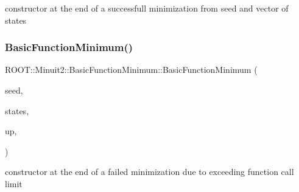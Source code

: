 constructor at the end of a successfull minimization from seed and vector of states 

\mbox{\label{classROOT_1_1Minuit2_1_1BasicFunctionMinimum_a2a15d2336acfb9f3be41de8e477c191a}} 
\subsubsection{\texorpdfstring{BasicFunctionMinimum()}{BasicFunctionMinimum()}\hspace{0.1cm}{\footnotesize\ttfamily [3/15]}}
{\footnotesize\ttfamily R\+O\+O\+T\+::\+Minuit2\+::\+Basic\+Function\+Minimum\+::\+Basic\+Function\+Minimum (\begin{DoxyParamCaption}\item[{const \mbox{\hyperlink{classROOT_1_1Minuit2_1_1MinimumSeed}{Minimum\+Seed}} \&}]{seed,  }\item[{const std\+::vector$<$ \mbox{\hyperlink{classROOT_1_1Minuit2_1_1MinimumState}{Minimum\+State}} $>$ \&}]{states,  }\item[{double}]{up,  }\item[{\mbox{\hyperlink{classROOT_1_1Minuit2_1_1BasicFunctionMinimum_1_1MnReachedCallLimit}{Mn\+Reached\+Call\+Limit}}}]{ }\end{DoxyParamCaption})\hspace{0.3cm}{\ttfamily [inline]}}



constructor at the end of a failed minimization due to exceeding function call limit 

\mbox{\label{classROOT_1_1Minuit2_1_1BasicFunctionMinimum_ae30a460175a2bbf715f3ee0d6092c8b6}} 

